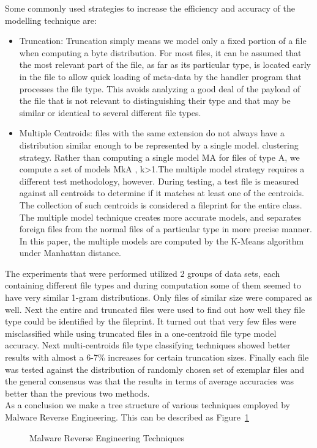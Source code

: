 \documentclass[11pt]{article}
\begin{document}
		Some commonly used strategies to increase the efficiency and accuracy of the modelling technique are:
		\begin{itemize}
			\item Truncation: Truncation simply means we model only a fixed portion of a file when computing a byte distribution. For most files, it can be assumed that the most relevant part of the file, as far as its particular type, is located early in the file to allow quick loading of meta-data by the handler program that processes the file type. This avoids analyzing a good deal of the payload of the file that is not relevant to distinguishing their type and that may be similar or identical to several different file types.
			\item Multiple Centroids: files with the same extension do not always have a distribution similar enough to be represented by a single model. clustering strategy. Rather than computing a single model MA for files of type A, we compute a set of models MkA , k>1.The multiple model strategy requires a different test methodology, however. During testing, a test file is measured against all centroids to determine if it matches at least one of the centroids. The collection of such centroids is considered a fileprint for the entire class. The multiple model technique creates more accurate models, and separates foreign files from the normal files of a particular type in more precise manner. In this paper, the multiple models are computed by the K-Means algorithm under Manhattan distance.
		\end{itemize}
		The experiments that were performed utilized 2 groups of data sets, each containing different file types and during computation some of them seemed to have very similar 1-gram distributions. Only files of similar size were compared as well. Next the entire and truncated files were used to find out how well they file type could be identified by the fileprint. It turned out that very few files were misclassified while using truncated files in a one-centroid file type model accuracy. Next multi-centroids file type classifying techniques showed better results with almost a 6-7\% increases for certain truncation sizes. Finally each file was tested against the distribution of randomly chosen set of exemplar files and the general consensus was that the results in terms of average accuracies was better than the previous two methods.\\
		As a conclusion we make a tree structure of various techniques employed by Malware Reverse Engineering. This can be described as Figure~\ref{Reverse}\\
		\begin{figure}[b]
			\centering
			\caption{Malware Reverse Engineering Techniques}\label{Reverse}
		\end{figure}
\end{document}
